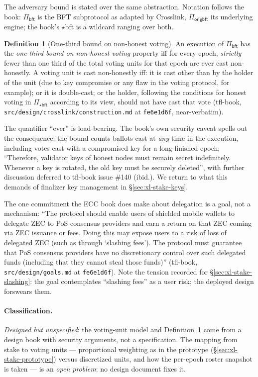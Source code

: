\documentclass[11pt,a4paper]{article}
\theoremstyle{definition}
\newtheorem{definition}[theorem]{Definition}
\begin{document}
The adversary bound is stated over the same abstraction. Notation follows
the book: $\Pi_{\mathsf{bft}}$ is the BFT subprotocol as adapted by
Crosslink, $\Pi_{\mathsf{origbft}}$ its underlying engine; the book's
$\star$bft is a wildcard ranging over both.

\begin{definition}[One-third bound on non-honest voting]
\label{def:xl-nonhonest}
An execution of $\Pi_{\mathsf{bft}}$ has the \emph{one-third bound on
non-honest voting} property iff for every epoch, \emph{strictly} fewer
than one third of the total voting units for that epoch are ever cast
non-honestly. A voting unit is cast non-honestly iff: it is cast other
than by the holder of the unit (due to key compromise or any flaw in the
voting protocol, for example); or it is double-cast; or the holder,
following the conditions for honest voting in $\Pi_{\star\mathsf{bft}}$
according to its view, should not have cast that vote (tfl-book,
\texttt{src/design/crosslink/construction.md} at \texttt{fe6e1d6f},
near-verbatim).
\end{definition}

The quantifier ``ever'' is load-bearing. The book's own security caveat
spells out the consequence: the bound counts ballots cast at \emph{any}
time in the execution, including votes cast with a compromised key for a
long-finished epoch; ``Therefore, validator keys of honest nodes must
remain secret indefinitely. Whenever a key is rotated, the old key must be
securely deleted'', with further discussion deferred to tfl-book issue
\#140 (ibid.). We return to what this demands of finalizer key management
in \S\ref{sec:xl-stake-keys}.

The one commitment the ECC book does make about delegation is a goal, not
a mechanism: ``The protocol should enable users of shielded mobile wallets
to delegate ZEC to PoS consensus providers and earn a return on that ZEC
coming via ZEC issuance or fees. Doing this may expose users to a risk of
loss of delegated ZEC (such as through `slashing fees'). The protocol must
guarantee that PoS consensus providers have no discretionary control over
such delegated funds (including that they cannot steal those funds)''
(tfl-book, \texttt{src/design/goals.md} at \texttt{fe6e1d6f}). Note the
tension recorded for \S\ref{sec:xl-stake-slashing}: the goal contemplates
``slashing fees'' as a user risk; the deployed design forswears them.

\paragraph{Classification.} \emph{Designed but unspecified}: the voting-unit
model and Definition~\ref{def:xl-nonhonest} come from a design book with
security arguments, not a specification. The mapping from stake to voting
units --- proportional weighting as in the prototype
(\S\ref{sec:xl-stake-prototype}) versus discretized units, and how the
per-epoch roster snapshot is taken --- is an \emph{open problem}: no design
document fixes it.
\end{document}
